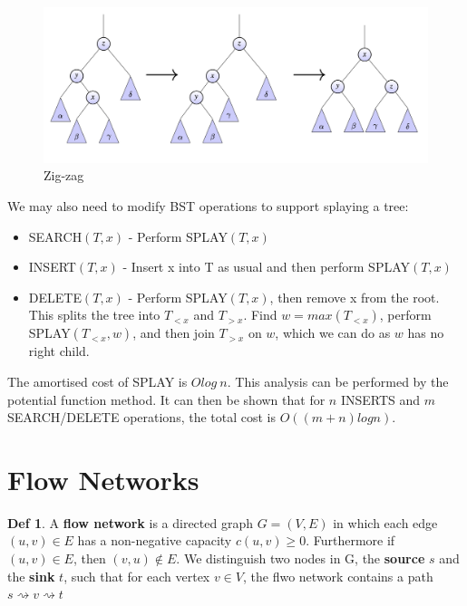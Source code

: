\documentclass{article}
\theoremstyle{plain}
\theoremstyle{definition}
\newtheorem{defn}[dummy]{Def}
\begin{document}
    \begin{figure}
            \centering
            \includegraphics[width=\linewidth]{images/zigzag.png}
            \caption{Zig-zag}
            \label{fig:zigzag}
    \end{figure}

    We may also need to modify BST operations to support splaying a tree:
    \begin{itemize}
        \item SEARCH$(T,x)$ - Perform SPLAY$(T, x)$
        \item INSERT$(T,x)$ - Insert x into T as usual and then perform SPLAY$(T, x)$
        \item DELETE$(T,x)$ - Perform SPLAY$(T, x)$, then remove x from the root. This splits the tree into $T_{< x}$ and $T_{> x}$. Find $w = max(T_{< x})$, perform SPLAY$(T_{< x}, w)$, and then join $T_{> x}$ on $w$, which we can do as $w$ has no right child. 
    \end{itemize}

    The amortised cost of SPLAY is $O log \ n$. This analysis can be performed by the potential function method. It can then be shown that for $n$ INSERTS and $m$ SEARCH/DELETE operations, the total cost is $O((m + n) log n)$. 
    
\section{Flow Networks}

    \begin{defn}
        A \textbf{flow network} is a directed graph $G = (V,E)$ in which each edge $(u, v) \in E$ has a non-negative capacity $c(u,v) \geq 0$. Furthermore if $(u,v) \in E$, then $(v, u) \notin E$. We distinguish two nodes in G, the \textbf{source} $s$ and the \textbf{sink} $t$, such that for each vertex $v \in V$, the flwo network contains a path $s \rightsquigarrow v \rightsquigarrow t$
    \end{defn}
\end{document}
